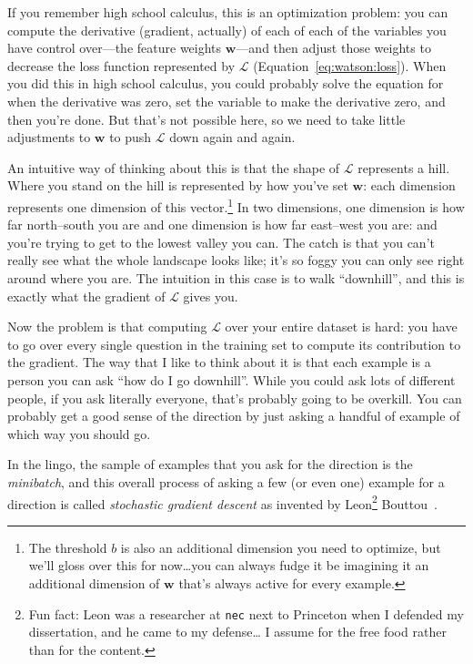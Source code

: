 If you remember high school calculus, this is an optimization problem: you can
compute the derivative (gradient, actually) of each of each of the variables
you have control over---the feature weights ${\bm w}$---and then adjust those
weights to decrease the loss function represented by $\mathcal{L}$
(Equation~\ref{eq:watson:loss}).
%
When you did this in high school calculus, you could probably solve the
equation for when the derivative was zero, set the variable to make the
derivative zero, and then you're done.
%
But that's not possible here, so we need to take little adjustments to ${\bm
  w}$ to push $\mathcal{L}$ down again and again.

An intuitive way of thinking about this is that the shape of $\mathcal{L}$
represents a hill.
%
Where you stand on the hill is represented by how you've set ${\bm w}$: each
dimension represents one dimension of this vector.\footnote{The threshold $b$
  is also an additional dimension you need to optimize, but we'll gloss over
  this for now\dots you can always fudge it be imagining it an additional
  dimension of ${\bm w}$ that's always active for every example.}
%
In two dimensions, one dimension is how far north--south you are and one
dimension is how far east--west you are: and you're trying to get to the
lowest valley you can.
%
The catch is that you can't really see what the whole landscape looks like;
it's so foggy you can only see right around where you are.
%
The intuition in this case is to walk ``downhill'', and this is exactly what
the gradient of $\mathcal{L}$ gives you.

Now the problem is that computing $\mathcal{L}$ over your entire dataset is
hard: you have to go over every single question in the \jeopardy{} training
set to compute its contribution to the gradient.
%
The way that I like to think about it is that each example is a person you can
ask ``how do I go downhill''.
%
While you could ask lots of different people, if you ask literally everyone,
that's probably going to be overkill.
%
You can probably get a good sense of the direction by just asking a handful of
example of which way you should go.

In the lingo, the sample of examples that you ask for the direction is the
\emph{minibatch}, and this overall process of asking a few (or even one)
example for a direction is called \emph{stochastic gradient descent} as
invented by Leon\footnote{Fun fact: Leon was a researcher at \texttt{nec} next
  to Princeton when I defended my dissertation, and he came to my defense\dots
  I assume for the free food rather than for the content.} Bouttou~\citep{}.

